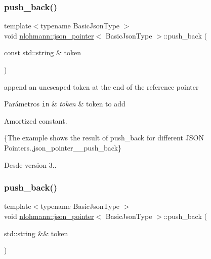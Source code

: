 \subsubsection{\texorpdfstring{push\+\_\+back()}{push\_back()}\hspace{0.1cm}{\footnotesize\ttfamily [1/2]}}
{\footnotesize\ttfamily template$<$typename Basic\+Json\+Type $>$ \\
void \mbox{\hyperlink{classnlohmann_1_1json__pointer}{nlohmann\+::json\+\_\+pointer}}$<$ Basic\+Json\+Type $>$\+::push\+\_\+back (\begin{DoxyParamCaption}\item[{const std\+::string \&}]{token }\end{DoxyParamCaption})\hspace{0.3cm}{\ttfamily [inline]}}



append an unescaped token at the end of the reference pointer 


\begin{DoxyParams}[1]{Parámetros}
\mbox{\tt in}  & {\em token} & token to add\\
\hline
\end{DoxyParams}
Amortized constant.

\{The example shows the result of {\ttfamily push\+\_\+back} for different J\+S\+ON Pointers.,json\+\_\+pointer\+\_\+\+\_\+push\+\_\+back\}

\begin{DoxySince}{Desde}
version 3.. 
\end{DoxySince}
\mbox{\label{classnlohmann_1_1json__pointer_ac228b13596d3c34185da9fe61b570194}} 
\subsubsection{\texorpdfstring{push\+\_\+back()}{push\_back()}\hspace{0.1cm}{\footnotesize\ttfamily [2/2]}}
{\footnotesize\ttfamily template$<$typename Basic\+Json\+Type $>$ \\
void \mbox{\hyperlink{classnlohmann_1_1json__pointer}{nlohmann\+::json\+\_\+pointer}}$<$ Basic\+Json\+Type $>$\+::push\+\_\+back (\begin{DoxyParamCaption}\item[{std\+::string \&\&}]{token }\end{DoxyParamCaption})\hspace{0.3cm}{\ttfamily [inline]}}



